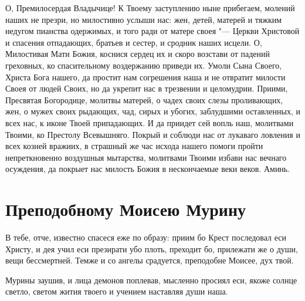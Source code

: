 О, Премилосердая Владычице! К Твоему заступлению ныне прибегаем, молений наших не презри, но милостивно услыши нас: жен, детей, матерей и тяжким недугом пианства одержимых, и того ради от матере своея "--- Церкви Христовой и спасения отпадающих, братьев и сестер, и сродник наших исцели. О, Милостивая Мати Божия, коснися сердец их и скоро возстави от падений греховных, ко спасительному воздержанию приведи их. Умоли Сына Своего, Христа Бога нашего, да простит нам согрешения наша и не отвратит милости Своея от людей Своих, но да укрепит нас в трезвении и целомудрии. Приими, Пресвятая Богородице, молитвы матерей, о чадех своих слезы проливающих, жен, о мужех своих рыдающих, чад, сирых и убогих, заблудшими оставленных, и всех нас, к иконе Твоей припадающих. И да приидет сей вопль наш, молитвами Твоими, ко Престолу Всевышняго. Покрый и соблюди нас от лукаваго ловления и всех козней вражиих, в страшный же час исхода нашего помоги пройти непреткновенно воздушныя мытарства, молитвами Твоими избави нас вечнаго осуждения, да покрыет нас милость Божия в нескончаемые веки веков. Аминь.


\section{Преподобному Моисею Мурину}
 




В тебе, отче, известно спасеся еже по образу: приим бо Крест последовал еси Христу, и дея учил еси презирати убо плоть, преходит бо, прилежати же о души, вещи бессмертней. Темже и со ангелы срадуется, преподобне Моисее, дух твой.




Мурины заушив, и лица демонов поплевав, мысленно просиял еси, якоже солнце светло, светом жития твоего и учением наставляя души наша.





